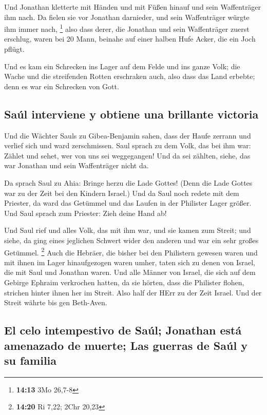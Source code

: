  Und Jonathan kletterte mit Händen und mit Füßen hinauf
und sein Waffenträger ihm nach. Da fielen sie vor Jonathan darnieder,
und sein Waffenträger würgte ihm immer nach, \footnote{\textbf{14:13}
  3Mo 26,7-8}  also dass derer, die Jonathan und sein
Waffenträger zuerst erschlug, waren bei 20 Mann, beinahe auf einer
halben Hufe Acker, die ein Joch pflügt.

 Und es kam ein Schrecken ins Lager auf dem Felde und ins
ganze Volk; die Wache und die streifenden Rotten erschraken auch, also
dass das Land erbebte; denn es war ein Schrecken von Gott.

\hypertarget{sauxfal-interviene-y-obtiene-una-brillante-victoria}{%
\subsection{Saúl interviene y obtiene una brillante
victoria}\label{sauxfal-interviene-y-obtiene-una-brillante-victoria}}

 Und die Wächter Sauls zu Gibea-Benjamin sahen, dass der
Haufe zerrann und verlief sich und ward zerschmissen. 
Saul sprach zu dem Volk, das bei ihm war: Zählet und sehet, wer von uns
sei weggegangen! Und da sei zählten, siehe, das war Jonathan und sein
Waffenträger nicht da.

 Da sprach Saul zu Ahia: Bringe herzu die Lade Gottes!
(Denn die Lade Gottes war zu der Zeit bei den Kindern Israel.)
 Und da Saul noch redete mit dem Priester, da ward das
Getümmel und das Laufen in der Philister Lager größer. Und Saul sprach
zum Priester: Zieh deine Hand ab!

 Und Saul rief und alles Volk, das mit ihm war, und sie
kamen zum Streit; und siehe, da ging eines jeglichen Schwert wider den
anderen und war ein sehr großes Getümmel. \footnote{\textbf{14:20} Ri
  7,22; 2Chr 20,23}  Auch die Hebräer, die bisher bei den
Philistern gewesen waren und mit ihnen im Lager hinaufgezogen waren
umher, taten sich zu denen von Israel, die mit Saul und Jonathan waren.
 Und alle Männer von Israel, die sich auf dem Gebirge
Ephraim verkrochen hatten, da sie hörten, dass die Philister flohen,
strichen hinter ihnen her im Streit.  Also half der HErr
zu der Zeit Israel. Und der Streit währte bis gen Beth-Aven.

\hypertarget{el-celo-intempestivo-de-sauxfal-jonathan-estuxe1-amenazado-de-muerte-las-guerras-de-sauxfal-y-su-familia}{%
\subsection{El celo intempestivo de Saúl; Jonathan está amenazado de
muerte; Las guerras de Saúl y su
familia}\label{el-celo-intempestivo-de-sauxfal-jonathan-estuxe1-amenazado-de-muerte-las-guerras-de-sauxfal-y-su-familia}}

